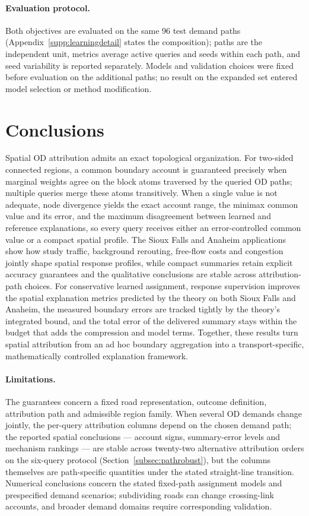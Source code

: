 \documentclass[a4paper,fleqn]{cas-sc}
\begin{document}
\paragraph{Evaluation protocol.}
Both objectives are evaluated on the same 96 test demand paths
(Appendix~\ref{supp:learningdetail} states the composition); paths are
the independent unit, metrics average active queries and seeds within
each path, and seed variability is reported separately. Models and
validation choices were fixed before evaluation on the additional
paths; no result on the expanded set entered model selection or method
modification.



\section{Conclusions}\label{sec:conclusions}
Spatial OD attribution admits an exact topological organization. For
two-sided connected regions, a common boundary account is guaranteed
precisely when marginal weights agree on the block atoms traversed by
the queried OD paths; multiple queries merge these atoms transitively.
When a single value is not adequate, node divergence yields the exact
account range, the minimax common value and its error, and the maximum
disagreement between learned and reference explanations, so every query
receives either an error-controlled common value or a compact spatial
profile. The Sioux Falls and Anaheim applications show how study
traffic, background rerouting, free-flow costs and congestion jointly
shape spatial response profiles, while compact summaries retain
explicit accuracy guarantees and the qualitative conclusions are stable
across attribution-path choices. For conservative learned assignment,
response supervision improves the spatial explanation metrics predicted
by the theory on both Sioux Falls and Anaheim, the measured boundary
errors are tracked tightly by the theory's integrated bound, and the
total error of the delivered summary stays within the budget that adds
the compression and model terms. Together, these results turn spatial
attribution from an ad hoc boundary aggregation into a
transport-specific, mathematically controlled explanation framework.

\paragraph{Limitations.}
The guarantees concern a fixed road representation, outcome definition,
attribution path and admissible region family. When several OD demands
change jointly, the per-query attribution columns depend on the chosen
demand path; the reported spatial conclusions --- account signs,
summary-error levels and mechanism rankings --- are stable across
twenty-two alternative attribution orders on the six-query protocol
(Section~\ref{subsec:pathrobust}), but the columns themselves are
path-specific quantities under the stated straight-line transition.
Numerical conclusions concern the stated fixed-path assignment models
and prespecified demand scenarios; subdividing roads can change
crossing-link accounts, and broader demand domains require
corresponding validation.
\end{document}
